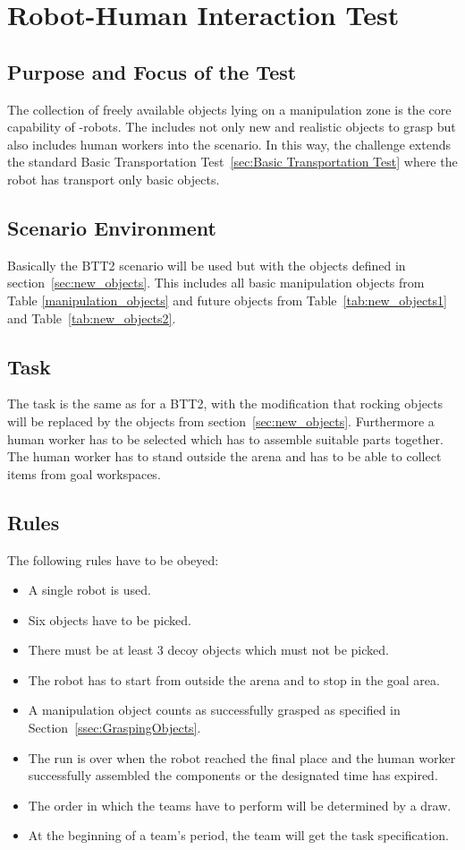 \newpage
\section{Robot-Human Interaction Test}

\subsection{Purpose and Focus of the Test}
The collection of freely available objects lying on a manipulation zone is the core capability of \RCAW-robots. The  includes not only new and realistic objects to grasp but also includes human workers into the scenario. In this way, the challenge extends the standard Basic Transportation Test~\ref{sec:Basic Transportation Test} where the robot has transport only basic objects. 

\subsection{Scenario Environment}
Basically the BTT2 scenario will be used but with the objects defined in section~\ref{sec:new_objects}. This includes all basic manipulation objects from Table \ref{manipulation_objects} and future objects from Table~\ref{tab:new_objects1} and Table~\ref{tab:new_objects2}.

\subsection{Task}
The task is the same as for a BTT2, with the modification that rocking objects will be replaced by the objects from section~\ref{sec:new_objects}. Furthermore a human worker has to be selected which has to assemble suitable parts together. The human worker has to stand outside the arena and has to be able to collect items from goal workspaces.

\subsection{Rules}
The following rules have to be obeyed:

\begin{itemize}
	\item A single robot is used.
	\item Six objects have to be picked.
	\item There must be at least 3 decoy objects which must not be picked.
	\item The robot has to start from outside the arena and to stop in the goal area.
	\item A manipulation object counts as successfully grasped as specified in Section~\ref{ssec:GraspingObjects}.
	\item The run is over when the robot reached the final place and the human worker successfully assembled the components or the designated time has expired.
	\item The order in which the teams have to perform will be determined by a draw.
	\item At the beginning of a team's period, the team will get the task specification.
\end{itemize}

